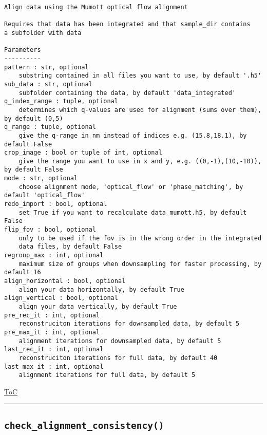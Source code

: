 \documentclass{article}
\begin{document}
\begin{lstlisting}[language=docstring]
Align data using the Mumott optical flow alignment

Requires that data has been integrated and that sample_dir contains
a subfolder with data

Parameters
----------
pattern : str, optional
    substring contained in all files you want to use, by default '.h5'
sub_data : str, optional
    subfolder containing the data, by default 'data_integrated'
q_index_range : tuple, optional
    determines which q-values are used for alignment (sums over them), by default (0,5)
q_range : tuple, optional
    give the q-range in nm instead of indices e.g. (15.8,18.1), by default False
crop_image : bool or tuple of int, optional
    give the range you want to use in x and y, e.g. ((0,-1),(10,-10)), by default False
mode : str, optional
    choose alignment mode, 'optical_flow' or 'phase_matching', by default 'optical_flow'
redo_import : bool, optional
    set True if you want to recalculate data_mumott.h5, by default False
flip_fov : bool, optional
    only to be used if the fov is in the wrong order in the integrated
    data files, by default False
regroup_max : int, optional
    maximum size of groups when downsampling for faster processing, by default 16
align_horizontal : bool, optional
    align your data horizontally, by default True
align_vertical : bool, optional
    align your data vertically, by default True
pre_rec_it : int, optional
    reconstruciton iterations for downsampled data, by default 5
pre_max_it : int, optional
    alignment iterations for downsampled data, by default 5
last_rec_it : int, optional
    reconstruciton iterations for full data, by default 40
last_max_it : int, optional
    alignment iterations for full data, by default 5
\end{lstlisting}

\begin{flushright}

\hyperref[toc]{ToC}

\end{flushright}



\vspace{5mm}

\hrule

\subsection*{\texttt{check\_alignment\_consistency()}}
\label{fun:checkalignmentconsistency}
\end{document}
